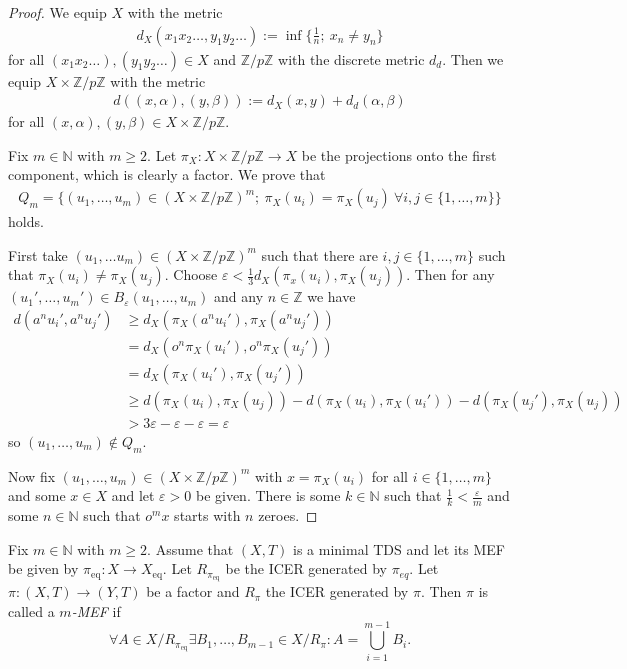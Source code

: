 \begin{proof}
	We equip $X$ with the metric
	\begin{align*}
		d_X(x_1x_2\dots, y_1y_2\dots) := \inf\{\frac{1}{n};\ x_n \neq y_n\}
	\end{align*}
	for all $(x_1x_2\dots), (y_1y_2\dots) \in X$ and $\mathbb{Z}/p\mathbb{Z}$ with the discrete metric $d_d$. Then we equip $X \times \mathbb{Z}/p\mathbb{Z}$ with the metric
	\begin{align*}
		d((x, \alpha), (y, \beta)) := d_X(x, y) + d_d(\alpha, \beta)
	\end{align*}
	for all $(x, \alpha), (y, \beta) \in X \times \mathbb{Z}/p\mathbb{Z}$.
	
	Fix $m \in \mathbb{N}$ with $m \geq 2$. Let $\pi_X: X \times \mathbb{Z}/p\mathbb{Z} \to X$ be the projections onto the first component, which is clearly a factor. We prove that
	\begin{align*}
		Q_m = \{(u_1, \dots, u_m) \in (X \times \mathbb{Z}/p\mathbb{Z})^m;\ \pi_X(u_i) = \pi_X(u_j)\ \forall i, j \in \{1, \dots, m\}\}
	\end{align*}
	holds.
	
	First take $(u_1, \dots u_m) \in (X \times \mathbb{Z}/p\mathbb{Z})^m$ such that there are $i, j \in \{1, \dots, m\}$ such that $\pi_X(u_i) \neq \pi_X(u_j)$. Choose $\varepsilon < \frac{1}{3} d_X(\pi_x(u_i), \pi_X(u_j))$. Then for any $(u_1', \dots, u_m') \in B_\varepsilon(u_1, \dots, u_m)$ and any $n \in \mathbb{Z}$ we have
	\begin{align*}
		d(a^nu_i', a^nu_j') &\geq d_X(\pi_X(a^nu_i'), \pi_X(a^nu_j'))\\
		&= d_X(o^n\pi_X(u_i'), o^n\pi_X(u_j'))\\
		&= d_X(\pi_X(u_i'), \pi_X(u_j'))\\
		&\geq d(\pi_X(u_i), \pi_X(u_j)) - d(\pi_X(u_i), \pi_X(u_i')) - d(\pi_X(u_j'), \pi_X(u_j))\\
		&> 3\varepsilon - \varepsilon - \varepsilon = \varepsilon
	\end{align*}
	so $(u_1, \dots, u_m) \notin Q_m$.
	
	Now fix $(u_1, \dots, u_m) \in (X \times \mathbb{Z}/p\mathbb{Z})^m$ with $x = \pi_X(u_i)$ for all $i \in \{1, \dots, m\}$ and some $x \in X$ and let $\varepsilon > 0$ be given. There is some $k \in \mathbb{N}$ such that $\frac{1}{k} < \frac{\varepsilon}{m}$ and some $n \in \mathbb{N}$ such that $o^m x$ starts with $n$ zeroes.
\end{proof}

\begin{definition}[$m$-MEF]
	Fix $m \in \mathbb{N}$ with $m \geq 2$. Assume that $(X, T)$ is a minimal TDS and let its MEF be given by $\pi_{\mathrm{eq}}: X \to X_{\mathrm{eq}}$. Let $R_{\pi_{\mathrm{eq}}}$ be the ICER generated by $\pi_{eq}$. Let $\pi: (X,T) \to (Y,T)$ be a factor and $R_\pi$ the ICER generated by $\pi$.
	Then $\pi$ is called a \emph{$m$-MEF} if
	\begin{equation*}
		\forall A \in X/R_{\pi_{\mathrm{eq}}} \exists B_1, \dots, B_{m-1} \in X/R_\pi: 
		A = \bigcup_{i=1}^{m-1} B_i.
	\end{equation*}
\end{definition}

